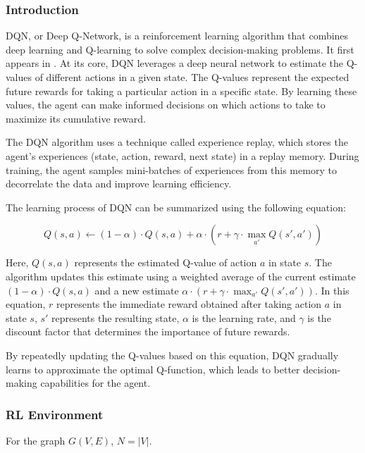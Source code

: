 \documentclass[twocolumn, a4paper]{extarticle}
\begin{document}
\subsubsection{Introduction}

DQN, or Deep Q-Network, is a reinforcement learning algorithm that combines deep learning and Q-learning to solve complex decision-making problems. It first appears in \cite{mnih2013playing}. At its core, DQN leverages a deep neural network to estimate the Q-values of different actions in a given state. The Q-values represent the expected future rewards for taking a particular action in a specific state. By learning these values, the agent can make informed decisions on which actions to take to maximize its cumulative reward. 

The DQN algorithm uses a technique called experience replay, which stores the agent's experiences (state, action, reward, next state) in a replay memory. During training, the agent samples mini-batches of experiences from this memory to decorrelate the data and improve learning efficiency.

The learning process of DQN can be summarized using the following equation:

\begin{equation}
	Q(s, a) \leftarrow (1 - \alpha) \cdot Q(s, a) + \alpha \cdot (r + \gamma \cdot \max_{a'} Q(s', a'))
\end{equation}

Here, $Q(s, a)$ represents the estimated Q-value of action $a$ in state $s$. The algorithm updates this estimate using a weighted average of the current estimate $(1 - \alpha) \cdot Q(s, a)$ and a new estimate $\alpha \cdot (r + \gamma \cdot \max_{a'} Q(s', a'))$. In this equation, $r$ represents the immediate reward obtained after taking action $a$ in state $s$, $s'$ represents the resulting state, $\alpha$ is the learning rate, and $\gamma$ is the discount factor that determines the importance of future rewards.

By repeatedly updating the Q-values based on this equation, DQN gradually learns to approximate the optimal Q-function, which leads to better decision-making capabilities for the agent.


\subsubsection{RL Environment}

For the graph $G(V, E)$, $N = |V|$.
\end{document}

